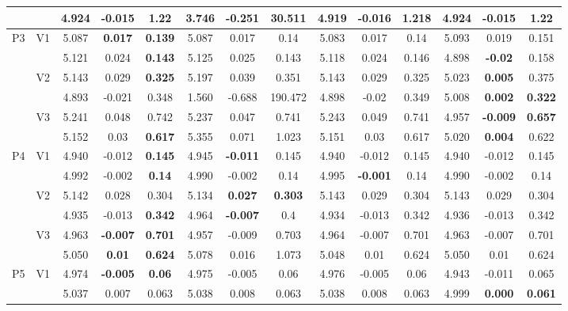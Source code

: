 \documentclass[12pt,a4paper]{article}
\begin{document}
\begin{sidewaystable}[ht]
{\begin{tabular}{cc|ccc|ccc|ccc|ccc|}
   &  & 4.924 & \textbf{-0.015} & 1.22 & 3.746 & -0.251 & 30.511 & 4.919 & -0.016 & \textbf{1.218} & 4.924 & -0.015 & 1.22 \\ 
   \hline \hline\multirow{6}{*}{P3} & \multirow{2}{*}{V1} & 5.087 & \textbf{0.017} & \textbf{0.139} & 5.087 & 0.017 & 0.14 & 5.083 & 0.017 & 0.14 & 5.093 & 0.019 & 0.151 \\ 
   &  & 5.121 & 0.024 & \textbf{0.143} & 5.125 & 0.025 & 0.143 & 5.118 & 0.024 & 0.146 & 4.898 & \textbf{-0.02} & 0.158 \\ 
   & \multirow{2}{*}{V2} & 5.143 & 0.029 & \textbf{0.325} & 5.197 & 0.039 & 0.351 & 5.143 & 0.029 & 0.325 & 5.023 & \textbf{0.005} & 0.375 \\ 
   &  & 4.893 & -0.021 & 0.348 & 1.560 & -0.688 & 190.472 & 4.898 & -0.02 & 0.349 & 5.008 & \textbf{0.002} & \textbf{0.322} \\ 
   & \multirow{2}{*}{V3} & 5.241 & 0.048 & 0.742 & 5.237 & 0.047 & 0.741 & 5.243 & 0.049 & 0.741 & 4.957 & \textbf{-0.009} & \textbf{0.657} \\ 
   &  & 5.152 & 0.03 & \textbf{0.617} & 5.355 & 0.071 & 1.023 & 5.151 & 0.03 & 0.617 & 5.020 & \textbf{0.004} & 0.622 \\ 
   \hline \hline\multirow{6}{*}{P4} & \multirow{2}{*}{V1} & 4.940 & -0.012 & \textbf{0.145} & 4.945 & \textbf{-0.011} & 0.145 & 4.940 & -0.012 & 0.145 & 4.940 & -0.012 & 0.145 \\ 
   &  & 4.992 & -0.002 & \textbf{0.14} & 4.990 & -0.002 & 0.14 & 4.995 & \textbf{-0.001} & 0.14 & 4.990 & -0.002 & 0.14 \\ 
   & \multirow{2}{*}{V2} & 5.142 & 0.028 & 0.304 & 5.134 & \textbf{0.027} & \textbf{0.303} & 5.143 & 0.029 & 0.304 & 5.143 & 0.029 & 0.304 \\ 
   &  & 4.935 & -0.013 & \textbf{0.342} & 4.964 & \textbf{-0.007} & 0.4 & 4.934 & -0.013 & 0.342 & 4.936 & -0.013 & 0.342 \\ 
   & \multirow{2}{*}{V3} & 4.963 & \textbf{-0.007} & \textbf{0.701} & 4.957 & -0.009 & 0.703 & 4.964 & -0.007 & 0.701 & 4.963 & -0.007 & 0.701 \\ 
   &  & 5.050 & \textbf{0.01} & \textbf{0.624} & 5.078 & 0.016 & 1.073 & 5.048 & 0.01 & 0.624 & 5.050 & 0.01 & 0.624 \\ 
   \hline \hline\multirow{6}{*}{P5} & \multirow{2}{*}{V1} & 4.974 & \textbf{-0.005} & \textbf{0.06} & 4.975 & -0.005 & 0.06 & 4.976 & -0.005 & 0.06 & 4.943 & -0.011 & 0.065 \\ 
   &  & 5.037 & 0.007 & 0.063 & 5.038 & 0.008 & 0.063 & 5.038 & 0.008 & 0.063 & 4.999 & \textbf{0.000} & \textbf{0.061} \\ 

\end{tabular}}
\end{sidewaystable}
\end{document}
